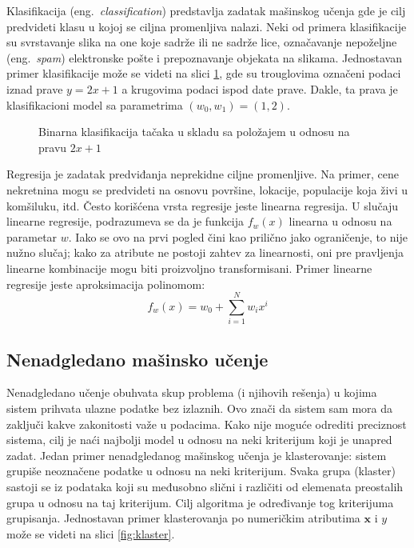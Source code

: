 Klasifikacija (eng.~{\em classification}) predstavlja zadatak mašinskog učenja gde je cilj predvideti klasu u kojoj se ciljna promenljiva nalazi. Neki od primera klasifikacije su svrstavanje slika na one koje sadrže ili ne sadrže lice, označavanje nepoželjne (eng.~{\em spam}) elektronske pošte i prepoznavanje objekata na slikama. 
Jednostavan primer klasifikacije može se videti na slici \ref{fig:bin_klas}, gde su trouglovima označeni podaci iznad prave $y=2x+1$ a krugovima podaci ispod date prave. Dakle, ta prava je klasifikacioni model sa parametrima $(w_0, w_1) = (1, 2)$.

\begin{figure}
	\centering
	\resizebox{.8\linewidth}{!}{}
	\caption{Binarna klasifikacija tačaka u skladu sa položajem u odnosu na pravu $2x+1$}
	\label{fig:bin_klas}
\end{figure}

\par
Regresija je zadatak predviđanja neprekidne ciljne promenljive. Na primer, cene nekretnina mogu se predvideti na osnovu površine, lokacije, populacije koja živi u komšiluku, itd. Često korišćena vrsta regresije jeste linearna regresija. U slučaju linearne regresije, podrazumeva se da je funkcija $f_w(x)$ linearna u odnosu na parametar $w$. Iako se ovo na prvi pogled čini kao prilično jako ograničenje, to nije nužno slučaj; kako za atribute ne postoji zahtev za linearnosti, oni pre pravljenja linearne kombinacije mogu biti proizvoljno transformisani. Primer linearne regresije jeste aproksimacija polinomom:
\begin{equation}
	f_w(x) = w_0 + \sum_{i=1}^{N}w_ix^i
\end{equation}

\subsection{Nenadgledano mašinsko učenje}

Nenadgledano učenje obuhvata skup problema (i njihovih rešenja) u kojima sistem prihvata ulazne podatke bez izlaznih. Ovo znači da sistem sam mora da zaključi kakve zakonitosti važe u podacima.  Kako nije moguće odrediti preciznost sistema, cilj je naći najbolji model u odnosu na neki kriterijum koji je unapred zadat.
Jedan primer nenadgledanog mašinskog učenja je klasterovanje: sistem grupiše neoznačene podatke u odnosu na  neki kriterijum. Svaka grupa (klaster) sastoji se iz podataka koji su međusobno slični i različiti od elemenata preostalih grupa u odnosu na taj kriterijum. Cilj algoritma je određivanje tog kriterijuma grupisanja. Jednostavan primer klasterovanja po numeričkim atributima $\bm{x}$ i $y$ može se videti na slici \ref{fig:klaster}.
	
